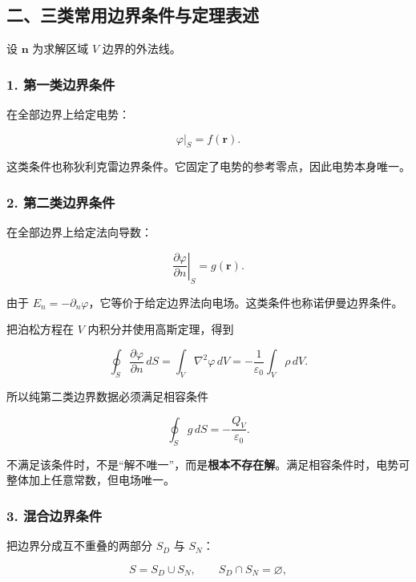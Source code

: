 \subsection{二、三类常用边界条件与定理表述}\label{m2:ux4e8cux4e09ux7c7bux5e38ux7528ux8fb9ux754cux6761ux4ef6ux4e0eux5b9aux7406ux8868ux8ff0}

设 \(\mathbf n\) 为求解区域 \(V\) 边界的外法线。

\subsubsection{1.
第一类边界条件}\label{m2:ux7b2cux4e00ux7c7bux8fb9ux754cux6761ux4ef6}

在全部边界上给定电势：

\[
\varphi|_S=f(\mathbf r).
\]

这类条件也称狄利克雷边界条件。它固定了电势的参考零点，因此电势本身唯一。

\subsubsection{2.
第二类边界条件}\label{m2:ux7b2cux4e8cux7c7bux8fb9ux754cux6761ux4ef6}

在全部边界上给定法向导数：

\[
\left.\frac{\partial\varphi}{\partial n}\right|_S=g(\mathbf r).
\]

由于
\(E_n=-\partial_n\varphi\)，它等价于给定边界法向电场。这类条件也称诺伊曼边界条件。

把泊松方程在 \(V\) 内积分并使用高斯定理，得到

\[
\oint_S\frac{\partial\varphi}{\partial n}\,dS
=\int_V\nabla^2\varphi\,dV
=-\frac1{\varepsilon_0}\int_V\rho\,dV.
\]

所以纯第二类边界数据必须满足相容条件

\[
\boxed{
\oint_S g\,dS
=-\frac{Q_V}{\varepsilon_0}.}
\]

不满足该条件时，不是``解不唯一''，而是\textbf{根本不存在解}。满足相容条件时，电势可整体加上任意常数，但电场唯一。

\subsubsection{3.
混合边界条件}\label{m2:ux6df7ux5408ux8fb9ux754cux6761ux4ef6}

把边界分成互不重叠的两部分 \(S_D\) 与 \(S_N\)：

\[
S=S_D\cup S_N,
\qquad
S_D\cap S_N=\varnothing,
\]

